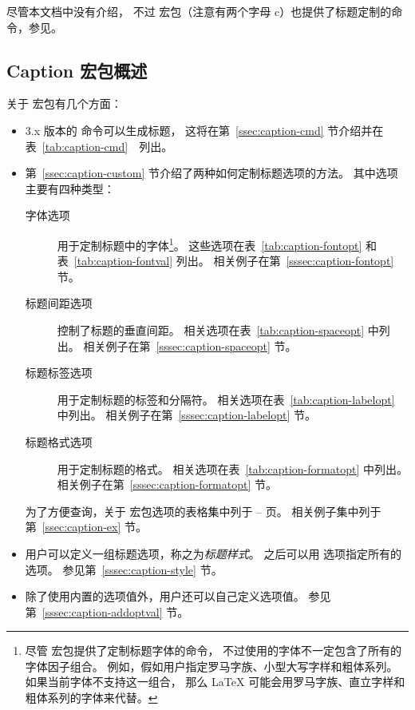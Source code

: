 尽管本文档中没有介绍，
不过  宏包（注意有两个字母 c）也提供了标题定制的命令，参见\cite{ccaption-doc}。

\subsection{Caption 宏包概述}\label{ssec:caption-overview}

关于  宏包有几个方面：
\begin{itemize}
	\item 3.x 版本的  命令可以生成标题，
	这将在第~\ref{ssec:caption-cmd} 节介绍并在表~\ref{tab:caption-cmd}　列出。
	
	\item 第~\ref{ssec:caption-custom} 节介绍了两种如何定制标题选项的方法。
	其中选项主要有四种类型：
	\begin{description}
		\item[字体选项] 用于定制标题中的字体\footnote{%
			尽管  宏包提供了定制标题字体的命令，
			不过使用的字体不一定包含了所有的字体因子组合。
			例如，假如用户指定罗马字族、小型大写字样和粗体系列。
			如果当前字体不支持这一组合，
			那么 \LaTeX{} 可能会用罗马字族、直立字样和粗体系列的字体来代替。}。
		这些选项在表~\ref{tab:caption-fontopt} 和表~\ref{tab:caption-fontval} 列出。
		相关例子在第~\ref{sssec:caption-fontopt} 节。
		
		\item[标题间距选项] 控制了标题的垂直间距。
		相关选项在表~\ref{tab:caption-spaceopt} 中列出。
		相关例子在第~\ref{sssec:caption-spaceopt} 节。
		
		\item[标题标签选项] 用于定制标题的标签和分隔符。
		相关选项在表~\ref{tab:caption-labelopt} 中列出。
		相关例子在第~\ref{sssec:caption-labelopt} 节。
		
		\item[标题格式选项] 用于定制标题的格式。
		相关选项在表~\ref{tab:caption-formatopt} 中列出。
		相关例子在第~\ref{sssec:caption-formatopt} 节。
	\end{description}
	为了方便查询，关于  宏包选项的表格集中列于 \pageref{tab:caption-fontopt}--\pageref{tab:caption-formatopt} 页。
	相关例子集中列于第~\ref{ssec:caption-ex} 节。
	
	\item 用户可以定义一组标题选项，称之为\emph{标题样式}。
	之后可以用  选项指定所有的选项。
	参见第~\ref{sssec:caption-style} 节。
	
	\item 除了使用内置的选项值外，用户还可以自己定义选项值。
	参见第~\ref{sssec:caption-addoptval} 节。
\end{itemize}

